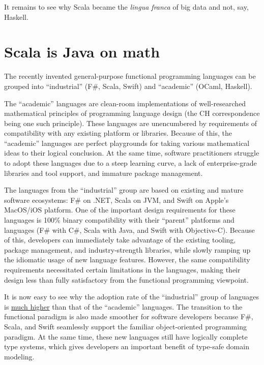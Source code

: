 It remains to see why Scala became the \emph{lingua franca} of big
data and not, say, Haskell.

\section{Scala is Java on math }

The recently invented general-purpose functional programming languages
can be grouped into ``industrial'' (F\#, Scala, Swift) and ``academic''
(OCaml, Haskell).

The ``academic'' languages are clean-room implementations of well-researched
mathematical principles of programming language design (the CH correspondence
being one such principle). These languages are unencumbered by requirements
of compatibility with any existing platform or libraries. Because
of this, the ``academic'' languages are perfect playgrounds for
taking various mathematical ideas to their logical conclusion. At
the same time, software practitioners struggle to adopt these languages
due to a steep learning curve, a lack of enterprise-grade libraries
and tool support, and immature package management.

The languages from the ``industrial'' group are based on existing
and mature software ecosystems: F\# on .NET, Scala on JVM, and Swift
on Apple's MacOS/iOS platform. One of the important design requirements
for these languages is 100\% binary compatibility with their ``parent''
platforms and languages (F\# with C\#, Scala with Java, and Swift
with Objective-C). Because of this, developers can immediately take
advantage of the existing tooling, package management, and industry-strength
libraries, while slowly ramping up the idiomatic usage of new language
features. However, the same compatibility requirements necessitated
certain limitations in the languages, making their design less than
fully satisfactory from the functional programming viewpoint.

It is now easy to see why the adoption rate of the ``industrial''
group of languages is \href{https://www.tiobe.com/tiobe-index/}{much higher}
than that of the ``academic'' languages. The transition to the functional
paradigm is also made smoother for software developers because F\#,
Scala, and Swift seamlessly support the familiar object-oriented programming
paradigm. At the same time, these new languages still have logically
complete type systems, which gives developers an important benefit
of type-safe domain modeling.

